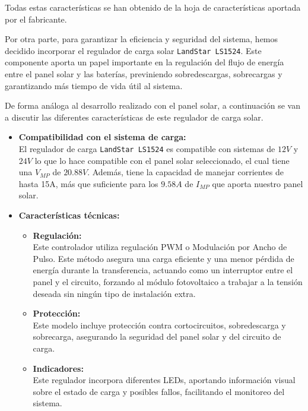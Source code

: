Todas estas características se han obtenido de la hoja de características aportada por el fabricante.\cite{semperesolutionsPanelSolarMonocristalino}

Por otra parte, para garantizar la eficiencia y seguridad del sistema, hemos decidido incorporar el regulador de carga solar \texttt{LandStar LS1524}. Este componente aporta un papel importante en la regulación del flujo de energía entre el panel solar y las baterías, previniendo sobredescargas, sobrecargas y garantizando más tiempo de vida útil al sistema.

De forma análoga al desarrollo realizado con el panel solar, a continuación se van a discutir las diferentes características de este regulador de carga solar.

\begin{itemize}
    \item \textbf{Compatibilidad con el sistema de carga:} \\
    El regulador de carga \texttt{LandStar LS1524} es compatible con sistemas de $12 V$ y $24 V$ lo que lo hace compatible con el panel solar seleccionado, el cual tiene una $V_{MP}$ de $20.88 V$. Además, tiene la capacidad de manejar corrientes de hasta 15A, más que suficiente para los $9.58 A$ de $I_{MP}$ que aporta nuestro panel solar.

    \item \textbf{Características técnicas:}
    \begin{itemize}
        \item \textbf{Regulación:} \\
        Este controlador utiliza regulación PWM o Modulación por Ancho de Pulso. Este método asegura una carga eficiente y una menor pérdida de energía durante la transferencia, actuando como un interruptor entre el panel y el circuito, forzando al módulo fotovoltaico a trabajar a la tensión deseada sin ningún tipo de instalación extra.
        \item \textbf{Protección:} \\
        Este modelo incluye protección contra cortocircuitos, sobredescarga y sobrecarga, asegurando la seguridad del panel solar y del circuito de carga.
        \item \textbf{Indicadores:} \\
        Este regulador incorpora diferentes LEDs, aportando información visual sobre el estado de carga y posibles fallos, facilitando el monitoreo del sistema.
    \end{itemize}


\end{itemize}
